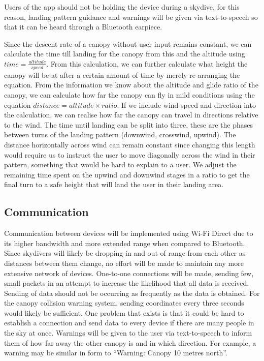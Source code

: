 \documentclass[11pt, a4paper, twocolumn]{article}
\begin{document}
Users of the app should not be holding the device during a skydive, for this reason, landing pattern guidance and warnings will be given via text-to-speech so that it can be heard through a Bluetooth earpiece.

Since the descent rate of a canopy without user input remains constant, we can calculate the time till landing for the canopy from this and the altitude using \( time = \frac{altitude} {speed} \). From this calculation, we can further calculate what height the canopy will be at after a certain amount of time by merely re-arranging the equation.
From the information we know about the altitude and glide ratio of the canopy, we can calculate how far the canopy can fly in mild conditions using the equation \( distance = altitude \times ratio \). If we include wind speed and direction into the calculation, we can realise how far the canopy can travel in directions relative to the wind.
The time until landing can be split into three, these are the phases between turns of the landing pattern (downwind, crosswind, upwind). The distance horizontally across wind can remain constant since changing this length would require us to instruct the user to move diagonally across the wind in their pattern, something that would be hard to explain to a user. We adjust the remaining time spent on the upwind and downwind stages in a ratio to get the final turn to a safe height that will land the user in their landing area.

\subsection{Communication} %
Communication between devices will be implemented using Wi-Fi Direct due to its higher bandwidth and more extended range when compared to Bluetooth. Since skydivers will likely be dropping in and out of range from each other as distances between them change, no effort will be made to maintain any more extensive network of devices. One-to-one connections will be made, sending few, small packets in an attempt to increase the likelihood that all data is received. Sending of data should not be occurring as frequently as the data is obtained. For the canopy collision warning system, sending coordinates every three seconds would likely be sufficient. One problem that exists is that it could be hard to establish a connection and send data to every device if there are many people in the sky at once.
Warnings will be given to the user via text-to-speech to inform them of how far away the other canopy is and in which direction. For example, a warning may be similar in form to ``Warning: Canopy 10 metres north''.
\end{document}
